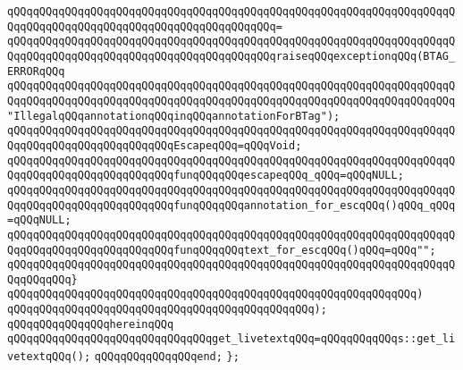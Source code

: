 \verb|qQQqqQQqqQQqqQQqqQQqqQQqqQQqqQQqqQQqqQQqqQQqqQQqqQQqqQQqqQQqqQQqqQQqqQQqqQQqqQQqqQQqqQQqqQQqqQQqqQQqqQQqqQQqqQQq=|\newline
\verb|qQQqqQQqqQQqqQQqqQQqqQQqqQQqqQQqqQQqqQQqqQQqqQQqqQQqqQQqqQQqqQQqqQQqqQQqqQQqqQQqqQQqqQQqqQQqqQQqqQQqqQQqqQQqqQQqraiseqQQqexceptionqQQq(BTAG_ERRORqQQq|\newline
\verb|qQQqqQQqqQQqqQQqqQQqqQQqqQQqqQQqqQQqqQQqqQQqqQQqqQQqqQQqqQQqqQQqqQQqqQQqqQQqqQQqqQQqqQQqqQQqqQQqqQQqqQQqqQQqqQQqqQQqqQQqqQQqqQQqqQQqqQQqqQQq"IllegalqQQqannotationqQQqinqQQqannotationForBTag");|\newline
\newline
\verb|qQQqqQQqqQQqqQQqqQQqqQQqqQQqqQQqqQQqqQQqqQQqqQQqqQQqqQQqqQQqqQQqqQQqqQQqqQQqqQQqqQQqqQQqqQQqqQQqEscapeqQQq=qQQqVoid;|\newline
\newline
\verb|qQQqqQQqqQQqqQQqqQQqqQQqqQQqqQQqqQQqqQQqqQQqqQQqqQQqqQQqqQQqqQQqqQQqqQQqqQQqqQQqqQQqqQQqqQQqqQQqfunqQQqqQQqescapeqQQq_qQQq=qQQqNULL;|\newline
\verb|qQQqqQQqqQQqqQQqqQQqqQQqqQQqqQQqqQQqqQQqqQQqqQQqqQQqqQQqqQQqqQQqqQQqqQQqqQQqqQQqqQQqqQQqqQQqqQQqfunqQQqqQQqannotation_for_escqQQq()qQQq_qQQq=qQQqNULL;|\newline
\verb|qQQqqQQqqQQqqQQqqQQqqQQqqQQqqQQqqQQqqQQqqQQqqQQqqQQqqQQqqQQqqQQqqQQqqQQqqQQqqQQqqQQqqQQqqQQqqQQqfunqQQqqQQqtext_for_escqQQq()qQQq=qQQq"";|\newline
\verb|qQQqqQQqqQQqqQQqqQQqqQQqqQQqqQQqqQQqqQQqqQQqqQQqqQQqqQQqqQQqqQQqqQQqqQQqqQQqqQQq}|\newline
\verb|qQQqqQQqqQQqqQQqqQQqqQQqqQQqqQQqqQQqqQQqqQQqqQQqqQQqqQQqqQQqqQQq)|\newline
\verb|qQQqqQQqqQQqqQQqqQQqqQQqqQQqqQQqqQQqqQQqqQQqqQQq);|\newline
\verb|qQQqqQQqqQQqqQQqhereinqQQq|\newline
\verb|qQQqqQQqqQQqqQQqqQQqqQQqqQQqqQQqget_livetextqQQq=qQQqqQQqqQQqs::get_livetextqQQq();|\newline
\verb|qQQqqQQqqQQqqQQqend;|\newline
\verb|};|\newline
\newline
\newline

